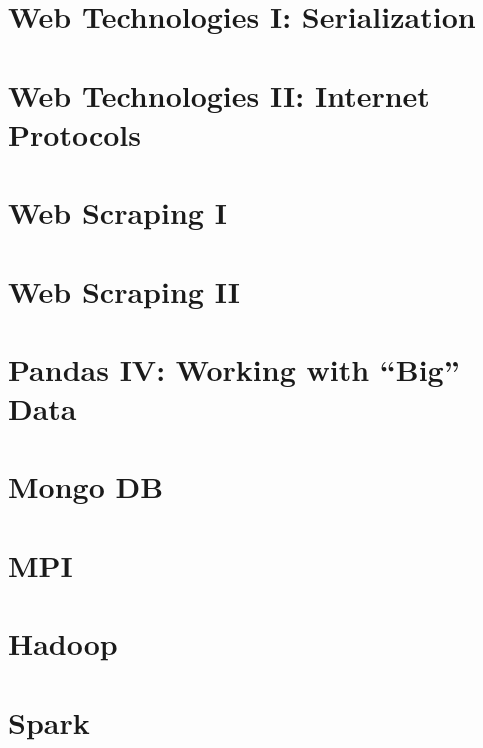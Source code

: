 
\section*{Web Technologies I: Serialization} %

\section*{Web Technologies II: Internet Protocols} %

\section*{Web Scraping I} %

\section*{Web Scraping II} %

\section*{Pandas IV: Working with ``Big'' Data} %

\section*{Mongo DB} %

\section*{MPI} %

\section*{Hadoop} %

\section*{Spark} %
